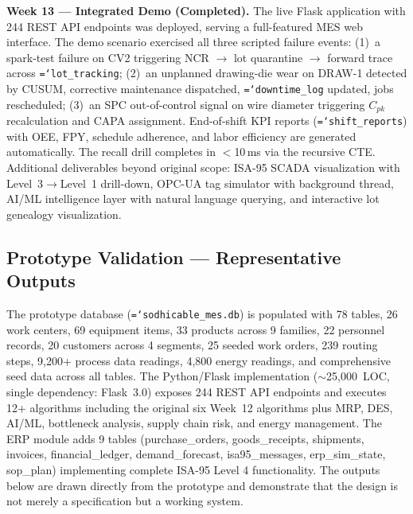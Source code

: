\documentclass[11pt]{article}
\newcommand{\tfield}[1]{\texttt{\hyphenchar\font=`\-\relax #1}}
\begin{document}
\textbf{Week 13 --- Integrated Demo (Completed).}
The live Flask application with 244 REST API endpoints was deployed, serving a full-featured MES web interface.  The demo scenario exercised all three scripted failure events: (1)~a spark-test failure on CV2 triggering NCR $\to$ lot quarantine $\to$ forward trace across \tfield{lot\_tracking}; (2)~an unplanned drawing-die wear on DRAW-1 detected by CUSUM, corrective maintenance dispatched, \tfield{downtime\_log} updated, jobs rescheduled; (3)~an SPC out-of-control signal on wire diameter triggering $C_{pk}$ recalculation and CAPA assignment.  End-of-shift KPI reports (\tfield{shift\_reports}) with OEE, FPY, schedule adherence, and labor efficiency are generated automatically.  The recall drill completes in $<$10\,ms via the recursive CTE.  Additional deliverables beyond original scope: ISA-95 SCADA visualization with Level~3$\to$Level~1 drill-down, OPC-UA tag simulator with background thread, AI/ML intelligence layer with natural language querying, and interactive lot genealogy visualization.

\subsection*{Prototype Validation --- Representative Outputs}

The prototype database (\tfield{sodhicable\_mes.db}) is populated with 78 tables, 26 work centers, 69 equipment items, 33 products across 9 families, 22 personnel records, 20 customers across 4 segments, 25 seeded work orders, 239 routing steps, 9{,}200+ process data readings, 4{,}800 energy readings, and comprehensive seed data across all tables.  The Python/Flask implementation (${\sim}$25{,}000~LOC, single dependency: Flask~3.0) exposes 244 REST API endpoints and executes 12+ algorithms including the original six Week~12 algorithms plus MRP, DES, AI/ML, bottleneck analysis, supply chain risk, and energy management.  The ERP module adds 9 tables (purchase\_orders, goods\_receipts, shipments, invoices, financial\_ledger, demand\_forecast, isa95\_messages, erp\_sim\_state, sop\_plan) implementing complete ISA-95 Level 4 functionality.  The outputs below are drawn directly from the prototype and demonstrate that the design is not merely a specification but a working system.
\end{document}
